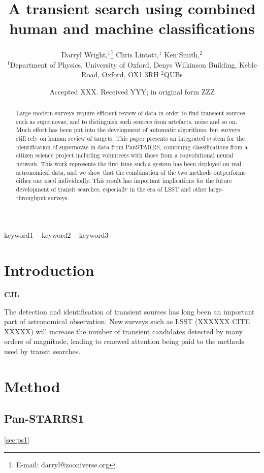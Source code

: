 \documentclass[a4paper,fleqn,usenatbib]{mnras}
\title[Human and machine classifications]{A transient search using combined human and machine classifications}
\author[D. Wright, C. Lintott, K. Smith et al.]{
Darryl Wright,$^{1}$\thanks{E-mail: darryl@zooniverse.org}
Chris Lintott,$^{1}$
Ken Smith,$^{2}$
\\
$^{1}$Department of Physics, University of Oxford, Denys Wilkinson Building, Keble Road, Oxford, OX1 3RH
$^{2}$QUBs
}
\date{Accepted XXX. Received YYY; in original form ZZZ}
\begin{document}
\label{firstpage}
\pagerange{\pageref{firstpage}--\pageref{lastpage}}
\maketitle

\begin{abstract}
Large modern surveys require efficient review of data in order to find transient sources such as supernovae, and to distinguish such sources from artefacts, noise and so on. Much effort has been put into the development of automatic algorithms, but surveys still rely on human review of targets. This paper presents an integrated system for the identification of supernovae in data from PanSTARRS, combining classifications from a citizen science project including volunteers with those from a convolutional neural network. This work represents the first time such a system has been deployed on real astronomical data, and we show that the combination of the two methods outperforms either one used individually. This result has important implications for the future development of transit searches, especially in the era of LSST and other large-throughput surveys. 
\end{abstract}

\begin{keywords}
keyword1 -- keyword2 -- keyword3
\end{keywords}



\section{Introduction}

\textbf{CJL}

The detection and identification of transient sources has long been an important part of astronomical observation. New surveys such as LSST (XXXXXX CITE XXXXX) will increase the number of transient candidates detected by many orders of magnitude, leading to renewed attention being paid to the methods used by transit searches. 




\section{Method}
\subsection{Pan-STARRS1}
\ref{sec:ps1}
\end{document}
